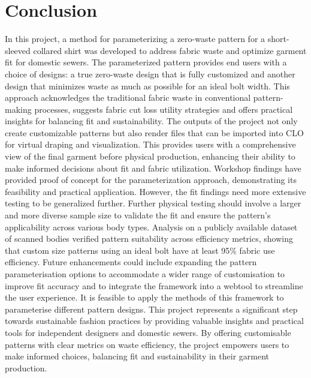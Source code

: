 \chapter{Conclusion}
In this project, a method for parameterizing a zero-waste pattern for a short-sleeved collared shirt was developed to address fabric waste and optimize garment fit for domestic sewers. The parameterized pattern provides end users with a choice of designs: a true zero-waste design that is fully customized and another design that minimizes waste as much as possible for an ideal bolt width. This approach acknowledges the traditional fabric waste in conventional pattern-making processes, suggests fabric cut loss utility strategies and offers practical insights for balancing fit and sustainability. The outputs of the project not only create customizable patterns but also render files that can be imported into CLO for virtual draping and visualization. This provides users with a comprehensive view of the final garment before physical production, enhancing their ability to make informed decisions about fit and fabric utilization. Workshop findings have provided proof of concept for the parameterization approach, demonstrating its feasibility and practical application. However, the fit findings need more extensive testing to be generalized further. Further physical testing should involve a larger and more diverse sample size to validate the fit and ensure the pattern’s applicability across various body types. Analysis on a publicly available dataset of scanned bodies verified pattern suitability across efficiency metrics, showing that custom size patterns using an ideal bolt have at least 95\% fabric use efficiency. Future enhancements could include expanding the pattern parameterisation options to accommodate a wider range of customisation to improve fit accuracy and to integrate the framework into a webtool to streamline the user experience. It is feasible to apply the methods of this framework to parameterise different pattern designs. This project represents a significant step towards sustainable fashion practices by providing valuable insights and practical tools for independent designers and domestic sewers. By offering customisable patterns with clear metrics on waste efficiency, the project empowers users to make informed choices, balancing fit and sustainability in their garment production.
